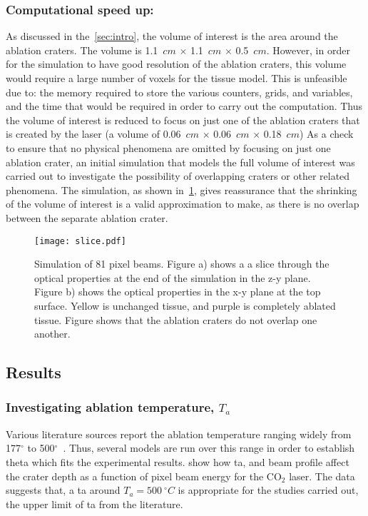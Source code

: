 \subsubsection*{Computational speed up:}
As discussed in the~\cref{sec:intro}, the volume of interest is the area around the ablation craters. The volume is 1.1~$cm$ $\times$ 1.1~$cm$ $\times$ 0.5~$cm$. However, in order for the simulation to have good resolution of the ablation craters, this volume would require a large number of voxels for the tissue model. This is unfeasible due to: the memory required to store the various counters, grids, and variables, and the time that would be required in order to carry out the computation. Thus the volume of interest is reduced to focus on just one of the ablation craters that is created by the laser (a volume of  0.06~$cm$ $\times$ 0.06~$cm$ $\times$ 0.18~$cm$) 
As a check to ensure that no physical phenomena are omitted by focusing on just one ablation crater, an initial simulation that models the full volume of interest was carried out to investigate the possibility of overlapping craters or other related phenomena. The simulation, as shown in~\cref{fig:sizecheck}, gives reassurance that the shrinking of the volume of interest is a valid approximation to make, as there is no overlap between the separate ablation crater.

\begin{figure}[!htbp]
	\centering
    \texttt{[image: slice.pdf]}
    \caption{Simulation of 81 pixel beams. Figure a) shows a a slice through the optical properties at the end of the simulation in the z-y plane. Figure b) shows the optical properties in the x-y plane at the top surface. Yellow is unchanged tissue, and purple is completely ablated tissue. Figure shows that the ablation craters do not overlap one another.}\label{fig:sizecheck}
\end{figure}

\subsection{Results}

\subsubsection*{Investigating ablation temperature, \texorpdfstring{$T_a$}{Ta}}

Various literature sources report the ablation temperature ranging widely from 177$^{\circ}$ to 500$^{\circ}$~\cite{gerstmann1994char,mckenzie1986three,sagi1992heating}. Thus, several models are run over this range in order to establish the\gls*{ta} which fits the experimental results.  show how \gls*{ta}, and beam profile affect the crater depth as a function of pixel beam energy for the CO$_2$ laser. The data suggests that, a \gls*{ta} around $T_a=500~^{\circ}C$ is appropriate for the studies carried out, the upper limit of \gls*{ta} from the literature.


